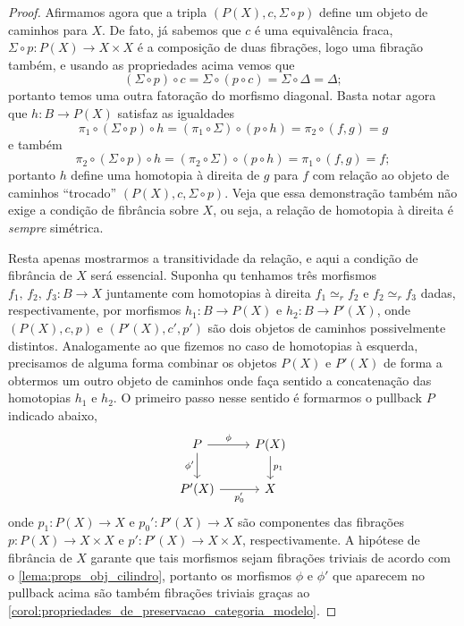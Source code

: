 \begin{proof}
  Afirmamos agora que a tripla $(P(X),c,\Sigma \circ p)$ define um objeto de caminhos para $X$.
  De fato, já sabemos que $c$ é uma equivalência fraca, $\Sigma \circ p: P(X) \to X \times X$ é a composição de duas fibrações, logo uma fibração também, e usando as propriedades acima vemos que
  \begin{displaymath}
    (\Sigma \circ p) \circ c = \Sigma \circ (p \circ c) = \Sigma \circ \Delta = \Delta;
  \end{displaymath}
  portanto temos uma outra fatoração do morfismo diagonal.
  Basta notar agora que $h: B \to P(X)$ satisfaz as igualdades
  \begin{displaymath}
    \pi_{1} \circ (\Sigma \circ p) \circ h = (\pi_{1} \circ \Sigma) \circ (p \circ h) = \pi_{2} \circ (f,g) = g
  \end{displaymath}
  e também
  \begin{displaymath}
    \pi_{2} \circ (\Sigma \circ p) \circ h = (\pi_{2} \circ \Sigma) \circ (p \circ h) = \pi_{1} \circ (f,g) = f;
  \end{displaymath}
  portanto $h$ define uma homotopia à direita de $g$ para $f$ com relação ao objeto de caminhos ``trocado'' $(P(X),c, \Sigma \circ p)$.
  Veja que essa demonstração também não exige a condição de fibrância sobre $X$, ou seja, a relação de homotopia à direita é \emph{sempre} simétrica.

  Resta apenas mostrarmos a transitividade da relação, e aqui a condição de fibrância de $X$ será essencial.
  Suponha qu tenhamos três morfismos $f_{1},\, f_{2},\, f_{3}: B \to X$ juntamente com homotopias à direita $f_{1} \simeq_{r} f_{2}$ e $f_{2} \simeq_{r} f_{3}$ dadas, respectivamente, por morfismos $h_{1}: B \to P(X)$ e $h_{2}: B \to P'(X)$, onde $(P(X),c,p)$ e $(P'(X),c',p')$ são dois objetos de caminhos possivelmente distintos.
  Analogamente ao que fizemos  no caso de homotopias à esquerda, precisamos de alguma forma combinar os objetos $P(X)$ e $P'(X)$ de forma a obtermos um outro objeto de caminhos onde faça sentido a concatenação das homotopias $h_{1}$ e $h_{2}$.
  O primeiro passo nesse sentido é formarmos o pullback $P$ indicado abaixo,
  \begin{displaymath}
    \begin{tikzcd}
      P
      \arrow[r, "\phi"]
      \arrow[d, "\phi'" swap]
      & P(X)
      \arrow[d, "p_{1}"]
      \\ P'(X)
      \arrow[r, "p_{0}'" swap]
      & X
    \end{tikzcd}
  \end{displaymath}
  onde $p_{1}: P(X) \to X$ e $p_{0}': P'(X) \to X$ são componentes das fibrações $p: P(X) \to X \times X$ e $p': P'(X) \to X \times X$, respectivamente.
  A hipótese de fibrância de $X$ garante que tais morfismos sejam fibrações triviais de acordo com o \cref{lema:props_obj_cilindro}, portanto os morfismos $\phi$ e $\phi'$ que aparecem no pullback acima são também fibrações triviais graças ao \cref{corol:propriedades_de_preservacao_categoria_modelo}.


\end{proof}
